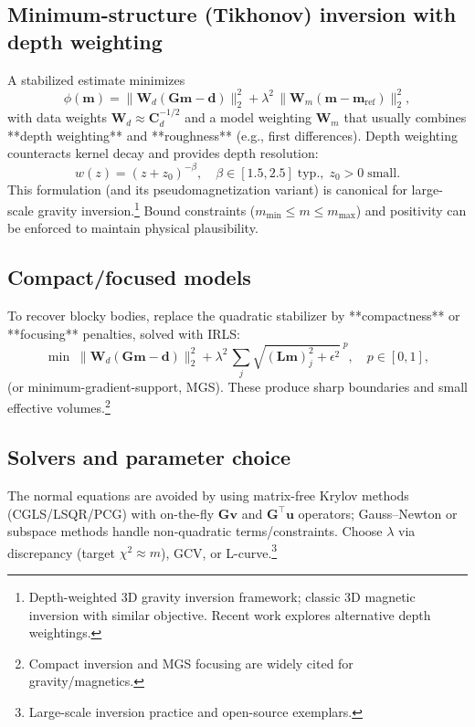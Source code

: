 \documentclass[11pt,a4paper]{article}
\begin{document}
\subsection{Minimum-structure (Tikhonov) inversion with depth weighting}
A stabilized estimate minimizes
\begin{equation}
  \phi(\mathbf{m}) = \|\mathbf{W}_d (\mathbf{G}\mathbf{m}-\mathbf{d})\|_2^2 + \lambda^2\,\|\mathbf{W}_m (\mathbf{m}-\mathbf{m}_{\mathrm{ref}})\|_2^2,
\end{equation}
with data weights $\mathbf{W}_d\approx \mathbf{C}_d^{-1/2}$ and a model weighting $\mathbf{W}_m$ that usually combines **depth weighting** and **roughness** (e.g., first differences). Depth weighting counteracts kernel decay and provides depth resolution:
\begin{equation}
  w(z) = (z+z_0)^{-\beta},\quad \beta\in[1.5,2.5]\;\text{typ.},\; z_0>0\;\text{small}.\label{eq:depthw}
\end{equation}
This formulation (and its pseudomagnetization variant) is canonical for large-scale gravity inversion.\footnote{Depth-weighted 3D gravity inversion framework; classic 3D magnetic inversion with similar objective. Recent work explores alternative depth weightings.}
Bound constraints ($m_{\min}\le m\le m_{\max}$) and positivity can be enforced to maintain physical plausibility.

\subsection{Compact/focused models}
To recover blocky bodies, replace the quadratic stabilizer by **compactness** or **focusing** penalties, solved with IRLS:
\begin{equation}
  \min\;\|\mathbf{W}_d (\mathbf{G}\mathbf{m}-\mathbf{d})\|_2^2 + \lambda^2\,\sum_j \sqrt{(\mathbf{L}\mathbf{m})_j^2+\epsilon^2}^{\;p},\quad p\in[0,1],
\end{equation}
(or minimum-gradient-support, MGS). These produce sharp boundaries and small effective volumes.\footnote{Compact inversion and MGS focusing are widely cited for gravity/magnetics.}

\subsection{Solvers and parameter choice}
The normal equations are avoided by using matrix-free Krylov methods (CGLS/LSQR/PCG) with on-the-fly $\mathbf{G}\mathbf{v}$ and $\mathbf{G}^\top\mathbf{u}$ operators; Gauss--Newton or subspace methods handle non-quadratic terms/constraints. Choose $\lambda$ via discrepancy (target $\chi^2\!\approx m$), GCV, or L-curve.\footnote{Large-scale inversion practice and open-source exemplars.}
\end{document}
